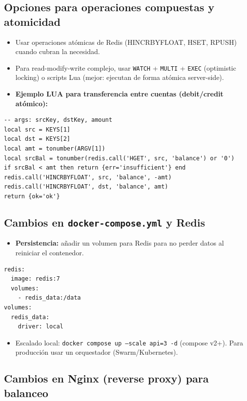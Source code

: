 \subsection{Opciones para operaciones compuestas y atomicidad}

\begin{itemize}[leftmargin=*]
    \item Usar operaciones atómicas de Redis (HINCRBYFLOAT, HSET, RPUSH) cuando cubran la necesidad.
    \item Para read-modify-write complejo, usar \texttt{WATCH} + \texttt{MULTI} + \texttt{EXEC} (optimistic locking) o scripts Lua (mejor: ejecutan de forma atómica server-side).
    \item \textbf{Ejemplo LUA para transferencia entre cuentas (debit/credit atómico):}
\end{itemize}

\begin{verbatim}
-- args: srcKey, dstKey, amount
local src = KEYS[1]
local dst = KEYS[2]
local amt = tonumber(ARGV[1])
local srcBal = tonumber(redis.call('HGET', src, 'balance') or '0')
if srcBal < amt then return {err='insufficient'} end
redis.call('HINCRBYFLOAT', src, 'balance', -amt)
redis.call('HINCRBYFLOAT', dst, 'balance', amt)
return {ok='ok'}
\end{verbatim}

\subsection{Cambios en \texttt{docker-compose.yml} y Redis}

\begin{itemize}[leftmargin=*]
    \item \textbf{Persistencia:} añadir un volumen para Redis para no perder datos al reiniciar el contenedor.
\end{itemize}

\begin{verbatim}
redis:
  image: redis:7
  volumes:
    - redis_data:/data
volumes:
  redis_data:
    driver: local
\end{verbatim}

\begin{itemize}[leftmargin=*]
    \item Escalado local: \texttt{docker compose up --scale api=3 -d} (compose v2+). Para producción usar un orquestador (Swarm/Kubernetes).
\end{itemize}

\subsection{Cambios en Nginx (reverse proxy) para balanceo}

